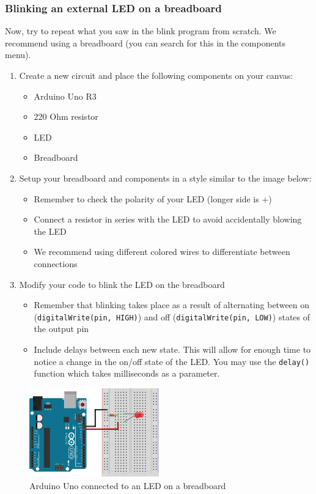 \documentclass{article}
\begin{document}
\subsubsection{Blinking an external LED on a breadboard}
Now, try to repeat what you saw in the blink program from scratch. We recommend using a breadboard (you can search for this in the components menu). 
\begin{enumerate}
  \item Create a new circuit and place the following components on your canvas:
  \begin{itemize}
    \item Arduino Uno R3
    \item 220 Ohm resistor
    \item LED
    \item Breadboard
\end{itemize}
  \item Setup your breadboard and components in a style similar to the image below:
  \begin{itemize}
    \item Remember to check the polarity of your LED (longer side is +)
    \item Connect a resistor in series with the LED to avoid accidentally blowing the LED
    \item We recommend using different colored wires to differentiate between connections
\end{itemize}
  \item Modify your code to blink the LED on the breadboard
  \begin{itemize}
    \item Remember that blinking takes place as a result of alternating between on (\texttt{digitalWrite(pin, HIGH)}) and off (\texttt{digitalWrite(pin, LOW)}) states of the output pin
    \item Include delays between each new state. This will allow for enough time to notice a change in the on/off state of the LED. You may use the \texttt{delay()} function which takes milliseconds as a parameter. 
\end{itemize}
\end{enumerate}
\begin{figure}[ht]
	\center
	\includegraphics[width=0.5\textwidth, keepaspectratio]{images/ledblink.jpg}
	\caption{Arduino Uno connected to an LED on a breadboard}
	\label{fig:ledblink}
\end{figure}
\end{document}
